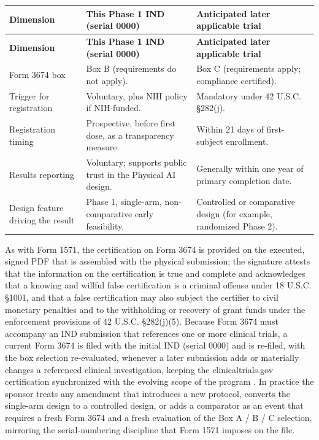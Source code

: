 \begin{center}
\begin{xltabular}{\textwidth}{>{\raggedright\arraybackslash}p{3.6cm} Y Y}
\toprule
\textbf{Dimension} & \textbf{This Phase 1 IND (serial 0000)} & \textbf{Anticipated later applicable trial} \\
\midrule
\endfirsthead
\toprule
\textbf{Dimension} & \textbf{This Phase 1 IND (serial 0000)} & \textbf{Anticipated later applicable trial} \\
\midrule
\endhead
\bottomrule
\endfoot
Form 3674 box & Box B (requirements do not apply). & Box C (requirements apply; compliance certified). \\
Trigger for registration & Voluntary, plus NIH policy if NIH-funded. & Mandatory under 42 U.S.C. \S 282(j). \\
Registration timing & Prospective, before first dose, as a transparency measure. & Within 21 days of first-subject enrollment. \\
Results reporting & Voluntary; supports public trust in the Physical AI design. & Generally within one year of primary completion date. \\
Design feature driving the result & Phase 1, single-arm, non-comparative early feasibility. & Controlled or comparative design (for example, randomized Phase 2). \\
\bottomrule
\end{xltabular}
\end{center}

As with Form 1571, the certification on Form 3674 is provided on the
executed, signed PDF that is assembled with the physical submission; the
signature attests that the information on the certification is true and
complete and acknowledges that a knowing and willful false certification
is a criminal offense under 18 U.S.C. \S 1001, and that a false
certification may also subject the certifier to civil monetary penalties
and to the withholding or recovery of grant funds under the enforcement
provisions of 42 U.S.C. \S 282(j)(5). Because Form 3674 must
accompany an IND submission that references one or more clinical trials,
a current Form 3674 is filed with the initial IND (serial 0000) and is
re-filed, with the box selection re-evaluated, whenever a later
submission adds or materially changes a referenced clinical
investigation, keeping the clinicaltrials.gov certification synchronized
with the evolving scope of the program \cite{phase1guidance,
paisitedocpk}. In practice the sponsor treats any amendment that
introduces a new protocol, converts the single-arm design to a controlled
design, or adds a comparator as an event that requires a fresh Form 3674
and a fresh evaluation of the Box A / B / C selection, mirroring the
serial-numbering discipline that Form 1571 imposes on the file.

